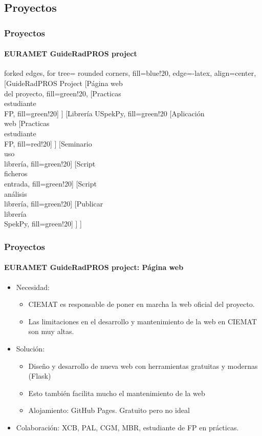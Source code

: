 \documentclass{beamer}
\newcommand{\highlight}[1]{{\color{blue} #1}}
\begin{document}
	\subsection{Proyectos}
		
	\begin{frame}
		\frametitle{Proyectos}
		\framesubtitle{EURAMET GuideRadPROS project}
		\centering
		\small
		\begin{forest}
			forked edges,
			for tree={
				rounded corners,
				fill=blue!20,
				edge={-latex},
				align=center,
			}
			[GuideRadPROS Project
				[Página web\\del proyecto, fill=green!20,
					[Practicas\\estudiante\\FP, fill=green!20]
				]
				[Librería USpekPy, fill=green!20
					[Aplicación\\web
						[Practicas\\estudiante\\FP, fill=red!20]
					]
					[Seminario\\uso\\librería, fill=green!20]
					[Script\\ficheros\\entrada, fill=green!20]
					[Script\\análisis\\librería, fill=green!20]
					[Publicar\\librería\\SpekPy, fill=green!20]
				]
			]
		\end{forest}
	\end{frame}
	
	\begin{frame}
		\frametitle{Proyectos}
		\framesubtitle{EURAMET GuideRadPROS project: Página web}
		\begin{itemize}
			\item Necesidad: 
			\begin{itemize}
				\item CIEMAT es responsable de poner en marcha la \highlight{web oficial del proyecto}.
				\item Las limitaciones en el desarrollo y mantenimiento de la web en CIEMAT son muy altas.
			\end{itemize}
			\item Solución:
			\begin{itemize}
				\item \highlight{Diseño y desarrollo} de nueva web con herramientas gratuitas y modernas (Flask)
				\item Esto también facilita mucho el \highlight{mantenimiento} de la web
				\item \highlight{Alojamiento}: GitHub Pages. Gratuito pero no ideal
			\end{itemize}
			\item Colaboración: XCB, PAL, CGM, MBR, estudiante de FP en prácticas.
		\end{itemize}
	\end{frame}
	
\end{document}
